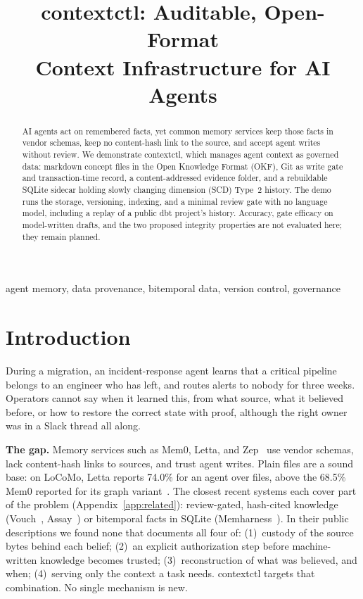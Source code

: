 \documentclass[conference,letterpaper]{IEEEtran}
\newcommand{\sysname}{contextctl}
\begin{document}
\title{contextctl: Auditable, Open-Format\\Context Infrastructure for AI Agents}
\author{
}
\maketitle

\begin{abstract}
AI agents act on remembered facts, yet common memory services keep those facts in vendor schemas, keep no content-hash link to the source, and accept agent writes without review. We demonstrate \sysname{}, which manages agent context as governed data: markdown concept files in the Open Knowledge Format (OKF), Git as write gate and transaction-time record, a content-addressed evidence folder, and a rebuildable SQLite sidecar holding slowly changing dimension (SCD) Type~2 history. The demo runs the storage, versioning, indexing, and a minimal review gate with no language model, including a replay of a public dbt project's history. Accuracy, gate efficacy on model-written drafts, and the two proposed integrity properties are not evaluated here; they remain planned.
\end{abstract}

\begin{IEEEkeywords}
agent memory, data provenance, bitemporal data, version control, governance
\end{IEEEkeywords}

\section{Introduction}
During a migration, an incident-response agent learns that a critical pipeline belongs to an engineer who has left, and routes alerts to nobody for three weeks. Operators cannot say when it learned this, from what source, what it believed before, or how to restore the correct state with proof, although the right owner was in a Slack thread all along.

\textbf{The gap.} Memory services such as Mem0, Letta, and Zep~\cite{mem0,memgpt,zep} use vendor schemas, lack content-hash links to sources, and trust agent writes. Plain files are a sound base: on LoCoMo, Letta reports 74.0\% for an agent over files, above the 68.5\% Mem0 reported for its graph variant~\cite{lettafs,mem0}. The closest recent systems each cover part of the problem (Appendix~\ref{app:related}): review-gated, hash-cited knowledge (Vouch~\cite{vouch}, Assay~\cite{assay}) or bitemporal facts in SQLite (Memharness~\cite{memharness}). In their public descriptions we found none that documents all four of: (1)~custody of the source bytes behind each belief; (2)~an explicit authorization step before machine-written knowledge becomes trusted; (3)~reconstruction of what was believed, and when; (4)~serving only the context a task needs. \sysname{} targets that combination. No single mechanism is new.
\end{document}
